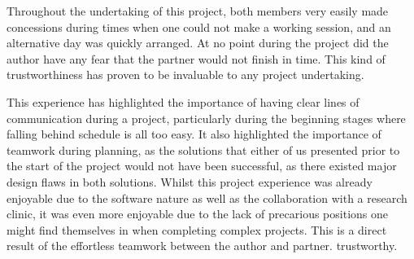 \documentclass[conference, onecolumn]{IEEEtran}
\begin{document}
Throughout the undertaking of this project, both members very easily made concessions during times when one could not make a working session, and an alternative day was quickly arranged.
At no point during the project did the author have any fear that the partner would not finish in time.
This kind of trustworthiness has proven to be invaluable to any project undertaking.

This experience has highlighted the importance of having clear lines of communication during a project, particularly during the beginning stages where falling behind schedule is all too easy.
It also highlighted the importance of teamwork during planning, as the solutions that either of us presented prior to the start of the project would not have been successful, as there existed major design flaws in both solutions.
Whilst this project experience was already enjoyable due to the software nature as well as the collaboration with a research clinic, it was even more enjoyable due to the lack of precarious positions one might find themselves in when completing complex projects.
This is a direct result of the effortless teamwork between the author and partner. trustworthy.
\end{document}
